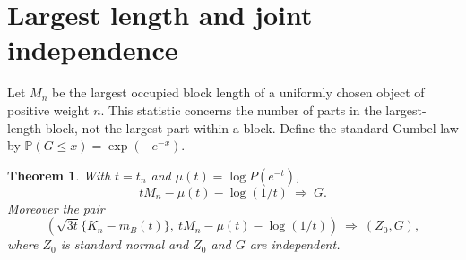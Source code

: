 \documentclass[11pt]{article}
\newtheorem{theorem}{Theorem}[section]
\theoremstyle{remark}\newtheorem{remark}[theorem]{Remark}
\newcommand{\PP}{\mathbb P}
\begin{document}
\section{Largest length and joint independence}\label{stp:len:sec:maximum}
Let $M_n$ be the largest occupied block length of a uniformly chosen object of positive weight $n$. This statistic concerns the number of parts in the largest-length block, not the largest part within a block. Define the standard Gumbel law by $\PP(G\le x)=\exp(-e^{-x})$.

\begin{theorem}\label{stp:len:thm:gumbel}
With $t=t_n$ and $\mu(t)=\log P(e^{-t})$,
\begin{equation}\label{stp:len:eq:gumbel}
 tM_n-\mu(t)-\log(1/t)\ \Longrightarrow\ G.
\end{equation}
Moreover the pair
\begin{equation}\label{stp:len:eq:joint}
 \left(\sqrt{3t}\{K_n-m_B(t)\},\ tM_n-\mu(t)-\log(1/t)\right)
 \ \Longrightarrow\ (Z_0,G),
\end{equation}
where $Z_0$ is standard normal and $Z_0$ and $G$ are independent.
\end{theorem}
\end{document}

